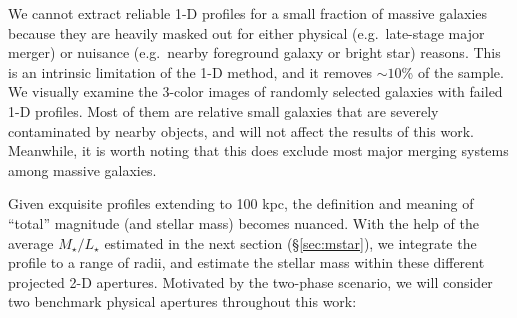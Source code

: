 \documentclass[a4paper,fleqn,usenatbib]{mnras}
\def\rbcg{\texttt{cenHighMh}}
\def\nbcg{\texttt{cenLowMh}}
\def\m2l{{$M_{\star}/L_{\star}$}}
\begin{document}
    
    We cannot extract reliable 1-D profiles for a small fraction of massive galaxies 
    because they are heavily masked out for either physical 
    (e.g.\ late-stage major merger) or nuisance (e.g.\ nearby foreground 
    galaxy or bright star) reasons. 
    This is an intrinsic limitation of the 1-D method, and it removes ${\sim}10$\% of 
    the sample.
    We visually examine the 3-color images of randomly selected galaxies with failed 
    1-D profiles.  
    Most of them are relative small galaxies that are severely contaminated by nearby 
    objects, and will not affect the results of this work.  
    Meanwhile, it is worth noting that this does exclude most major merging systems 
    among massive galaxies. 
        
    Given exquisite profiles extending to 100 kpc, the definition and meaning 
    of ``total'' magnitude (and stellar mass) becomes nuanced.
    With the help of the average \m2l{} estimated in the next section 
    (\S \ref{sec:mstar}), we integrate the profile to a range of radii, and estimate 
    the stellar mass within these different projected 2-D apertures.  
    Motivated by the two-phase scenario, we will consider two benchmark physical 
    apertures throughout this work:
    
\end{document}
